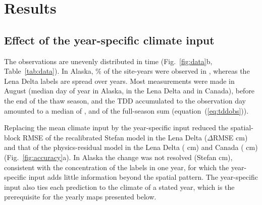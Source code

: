 \section{Results}\label{sec:results}

\subsection{Effect of the year-specific climate input}
The observations are unevenly distributed in time (Fig.~\ref{fig:data}b, Table~\ref{tab:data}). In Alaska, \ntopyrshareAk\% of the site-years were observed in \ntopyrAk, whereas the Lena Delta labels are spread over \nnyrLe{} years. Most measurements were made in August (median day of year \ndoymedAk{} in Alaska, \ndoymedLe{} in the Lena Delta and \ndoymedCa{} in Canada), before the end of the thaw season, and the TDD accumulated to the observation day amounted to a median of \ntddfracAk, \ntddfracLe{} and \ntddfracCa{} of the full-season sum (equation~(\ref{eq:tddobs})).

Replacing the mean climate input by the year-specific input reduced the spatial-block RMSE of the recalibrated Stefan model in the Lena Delta ($\Delta$RMSE \ndforcLePo{} cm) and that of the physics-residual model in the Lena Delta (\ndforcLeRo{} cm) and Canada (\ndforcCaRo{} cm) (Fig.~\ref{fig:accuracy}a). In Alaska the change was not resolved (Stefan \ndforcAkPo{} cm), consistent with the concentration of the labels in one year, for which the year-specific input adds little information beyond the spatial pattern. The year-specific input also ties each prediction to the climate of a stated year, which is the prerequisite for the yearly maps presented below.


